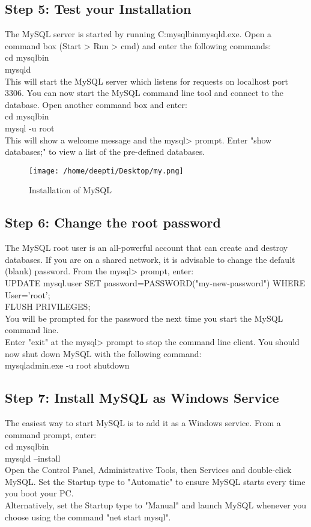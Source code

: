\subsection*{Step 5: Test your Installation}
The MySQL server is started by running C:mysqlbinmysqld.exe. Open a command box (Start > Run > cmd) and enter the following commands:\\
cd mysqlbin\\
mysqld\\
This will start the MySQL server which listens for requests on localhost port 3306. You can now start the MySQL command line tool and connect to the database. Open another command box and enter:\\
cd mysqlbin\\
mysql -u root\\
This will show a welcome message and the mysql> prompt. Enter "show databases;" to view a list of the pre-defined databases.
\begin{figure}[!ht]
\centering
\texttt{[image: /home/deepti/Desktop/my.png]}                   
\caption{Installation of MySQL}
\hspace{-1.5em}
\end{figure}
\subsection*{Step 6: Change the root password }
The MySQL root user is an all-powerful account that can create and destroy databases. If you are on a shared network, it is advisable to change the default (blank) password. From the mysql> prompt, enter:\\
UPDATE mysql.user SET password=PASSWORD("my-new-password") WHERE User='root';\\
FLUSH PRIVILEGES;\\
You will be prompted for the password the next time you start the MySQL command line.\\
Enter "exit" at the mysql> prompt to stop the command line client. You should now shut down MySQL with the following command:\\
mysqladmin.exe -u root shutdown
\subsection*{Step 7: Install MySQL as Windows Service}
The easiest way to start MySQL is to add it as a Windows service. From a command prompt, enter:\\
cd mysqlbin\\
mysqld --install\\
Open the Control Panel, Administrative Tools, then Services and double-click MySQL. Set the Startup type to "Automatic" to ensure MySQL starts every time you boot your PC.\\
Alternatively, set the Startup type to "Manual" and launch MySQL whenever you choose using the command "net start mysql".



